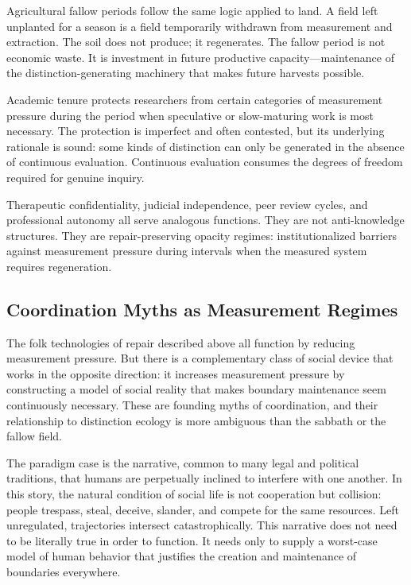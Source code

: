 \documentclass[12pt, a4paper]{article}
\theoremstyle{flyxion}
\begin{document}
Agricultural fallow periods follow the same logic applied to land. A field left unplanted for a season is a field temporarily withdrawn from measurement and extraction. The soil does not produce; it regenerates. The fallow period is not economic waste. It is investment in future productive capacity---maintenance of the distinction-generating machinery that makes future harvests possible.

Academic tenure protects researchers from certain categories of measurement pressure during the period when speculative or slow-maturing work is most necessary. The protection is imperfect and often contested, but its underlying rationale is sound: some kinds of distinction can only be generated in the absence of continuous evaluation. Continuous evaluation consumes the degrees of freedom required for genuine inquiry.

Therapeutic confidentiality, judicial independence, peer review cycles, and professional autonomy all serve analogous functions. They are not anti-knowledge structures. They are repair-preserving opacity regimes: institutionalized barriers against measurement pressure during intervals when the measured system requires regeneration.

\subsection*{Coordination Myths as Measurement Regimes}

The folk technologies of repair described above all function by reducing measurement pressure. But there is a complementary class of social device that works in the opposite direction: it increases measurement pressure by constructing a model of social reality that makes boundary maintenance seem continuously necessary. These are founding myths of coordination, and their relationship to distinction ecology is more ambiguous than the sabbath or the fallow field.

The paradigm case is the narrative, common to many legal and political traditions, that humans are perpetually inclined to interfere with one another. In this story, the natural condition of social life is not cooperation but collision: people trespass, steal, deceive, slander, and compete for the same resources. Left unregulated, trajectories intersect catastrophically. This narrative does not need to be literally true in order to function. It needs only to supply a worst-case model of human behavior that justifies the creation and maintenance of boundaries everywhere.
\end{document}
